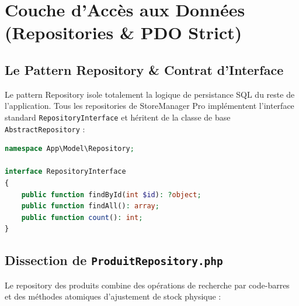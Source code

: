 \documentclass[11pt,a4paper,titlepage,twoside,openright]{report}
\begin{document}
\chapter{Couche d'Accès aux Données (Repositories \& PDO Strict)}

\section{Le Pattern Repository \& Contrat d'Interface}

Le pattern Repository isole totalement la logique de persistance SQL du reste de l'application. Tous les repositories de StoreManager Pro implémentent l'interface standard \texttt{RepositoryInterface} et héritent de la classe de base \texttt{AbstractRepository} :

\begin{lstlisting}[language=PHP, caption={Interface Repository (src/Model/Repository/RepositoryInterface.php)}]
namespace App\Model\Repository;

interface RepositoryInterface
{
    public function findById(int $id): ?object;
    public function findAll(): array;
    public function count(): int;
}
\end{lstlisting}

\section{Dissection de \texttt{ProduitRepository.php}}

Le repository des produits combine des opérations de recherche par code-barres et des méthodes atomiques d'ajustement de stock physique :
\end{document}

